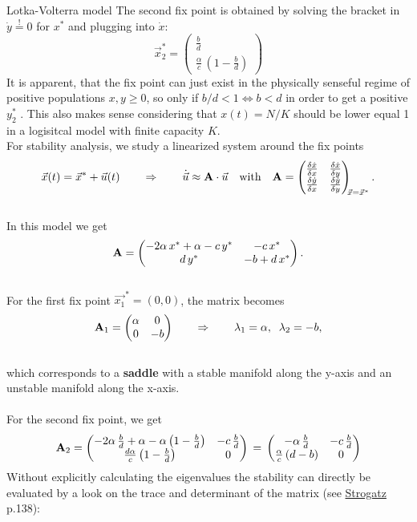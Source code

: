 \documentclass[11pt,headinclude,bibliography=totocnumbered,english,parskip=half-]{scrartcl}
\newcommand{\f}{\frac}
\begin{document}
\begin{section}
\begin{subsection}{Lotka-Volterra model}
The second fix point is obtained by solving the bracket in $\dot{y}\stackrel{!}{=}0$ for $x^*$ and plugging into $\dot{x}$:
$$
\vec{x}^*_2=
\begin{pmatrix}
\f{b}{d} \\
\f{\alpha}{c}\,(1- \f{b}{d})
\end{pmatrix}
$$
It is apparent, that the fix point can just exist in the physically senseful regime of positive populations $x,y \geq 0$, so only if $b/d < 1 \Leftrightarrow b < d$ in order to get a positive $y^*_2$ . This also makes sense considering that $x(t)=N/K$ should be lower equal 1 in a logisitcal model with finite capacity $K$.\\
For stability analysis, we study a linearized system around the fix points
$$
\vec{x}(t) = \vec{x}^* + \vec{u}(t) \qquad  \Rightarrow  \qquad \dot{\vec{u}} \approx \text{\textbf{A}}  \cdot \vec{u} \quad \text{with} \quad \text{\textbf{A}}= 
\begin{pmatrix}
 \frac{\delta \dot{x}}{\delta x}& \frac{\delta \dot{x}}{\delta y}\\
 \frac{\delta \dot{y}}{\delta x}& \frac{\delta \dot{y}}{\delta y}
\end{pmatrix}
_{\!\!\vec{x}=\vec{x}^*}.
$$\\
In this model we get
$$
\text{\textbf{A}}= 
\begin{pmatrix}
 -2\alpha\, x^* + \alpha - c\, y^* & - c \,x^*\\
 d \, y^* & -b+d\,x^*
\end{pmatrix}.
$$\\
For the first fix point $\vec{x_1}^*=(0,0)$, the matrix becomes
$$
\text{\textbf{A}}_1= 
\begin{pmatrix}
 \alpha & 0\\
 0 & -b
\end{pmatrix}
\qquad
\Rightarrow \qquad
\lambda_1 = \alpha, \;\; \lambda_2 =-b,
$$\\
which corresponds to a \textbf{saddle} with a stable manifold along the y-axis and an unstable manifold along the x-axis.\\\\
For the second fix point, we get
$$
\text{\textbf{A}}_2= 
\begin{pmatrix}
-2 \alpha \, \frac{b}{d} + \alpha - \alpha\left(1-\frac{b}{d}\right) & - c\, \frac{b}{d}\\
 \frac{d \alpha}{c} \left(1-\frac{b}{d}\right) & 0
\end{pmatrix} \, = \,
\begin{pmatrix}
 - \alpha \, \frac{b}{d} & -c \, \frac{b}{d}\\
 \frac{\alpha}{c}\left(d-b\right) & 0
\end{pmatrix}
$$
Without explicitly calculating the eigenvalues the stability can directly be evaluated by a look on the trace and determinant of the matrix (see \url{Strogatz} p.138):


\end{subsection}
\end{section}
\end{document}
